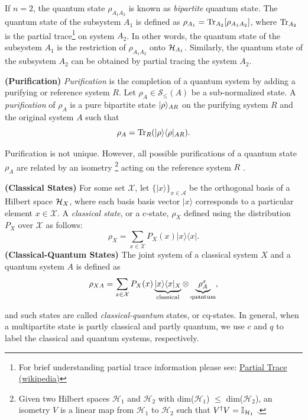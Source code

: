If $n=2$, the quantum state $\rho_{A_1A_2}$ is known as \emph{bipartite} quantum state. The quantum state of the subsystem $A_1$ is defined as $\rho_{A_1} = \operatorname{Tr}_{A_2}[\rho_{A_1A_2}]$, where $\operatorname{Tr}_{A_2}$ is the partial trace\footnote{For brief understanding partial trace information please see: \href{https://en.wikipedia.org/wiki/Partial\_trace}{Partial Trace (wikipedia)}} on system $A_2$. In other words, the quantum state of the subsystem $A_1$ is the restriction of $\rho_{A_1A_2}$ onto $\mathcal{H}_{A_1}$. Similarly, the quantum state of the subsystem $A_2$ can be obtained by partial tracing the system $A_2$.  

\begin{definition}\textbf{(Purification)}
\emph{Purification} is the completion of a quantum system by adding a purifying or reference system $R$. Let $\rho_A \in \mathcal{S}_{\leq}(A)$ be a sub-normalized state. 
A \emph{purification} of $\rho_A$ is a pure bipartite state $|\rho \rangle_{AR}$ on the purifying system $R$ and the original system $A$ such that
$$\rho_A = \operatorname{Tr}_R(|\rho \rangle\langle \rho|_{AR}).$$
\end{definition}
Purification is not unique. However, all possible purifications of a quantum state $\rho_A$ are related by an isometry \footnote{Given two Hilbert spaces $\mathcal{H}_1$ and $\mathcal{H}_2$ with dim($\mathcal{H}_1$) $\leq$ dim($\mathcal{H}_2$), an isometry $V$ is a linear map from $\mathcal{H}_1$ to $\mathcal{H}_2$ such that $V^\dag V = \mathbb{I}_{\mathcal{H}_1}$ \cite{wilde2013quantum,nielsen2002quantum}.} acting on the reference system $R$ \cite[Theorem 5.1.1]{wilde2013quantum}.

\begin{definition}\textbf{{(Classical States)}}
For some set $\mathcal{X}$, let $\{|x\rangle \}_{x \in \mathcal{A}}$ be the orthogonal basis of a Hilbert space $\mathcal{H}_X$, where each basis basis vector $|x\rangle$ corresponds to a particular element $x \in \mathcal{X}$. A \emph{classical state}, or a c-state, $\rho_X$ defined using the distribution $P_X$ over $\mathcal{X}$ as follows: 
$$\rho_X = \sum_{x \in \mathcal{X}}P_X(x)|x \rangle \langle x|.$$
\textbf{(Classical-Quantum States)} The joint system of a classical system $X$ and a quantum system $A$ is defined as
\[
  \rho_{XA} = \sum_{x \in \mathcal{X}}P_X(x)
    \underbrace{|x \rangle\langle x|_X}_\text{classical} \otimes \underbrace{\rho^x_A}_\text{quantum},
\]
\end{definition}
and such states are called \emph{classical-quantum} states, or cq-states. In general, when a multipartite state is partly classical and partly quantum, we use $c$ and $q$ to label the classical and quantum systems, respectively.

